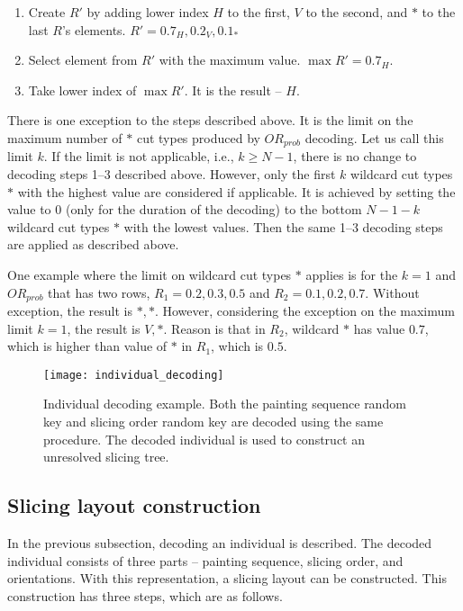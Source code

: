 \begin{enumerate}
    \item Create $R'$ by adding lower index $H$ to the first, $V$ to the second, and $*$ to the last $R$'s elements.
    $R' = 0.7_H, 0.2_V, 0.1_*$
    \item Select element from $R'$ with the maximum value. $\max R' = 0.7_H$.
    \item Take lower index of $\max R'$.
    It is the result – $H$.
\end{enumerate}

There is one exception to the steps described above.
It is the limit on the maximum number of $*$ cut types produced by $OR_{prob}$ decoding.
Let us call this limit $k$.
If the limit is not applicable, i.e., $k \geq N-1$, there is no change to decoding steps 1--3 described above.
However, only the first $k$ wildcard cut types $*$ with the highest value are considered if applicable.
It is achieved by setting the value to $0$ (only for the duration of the decoding) to the bottom $N-1-k$ wildcard cut types $*$ with the lowest values.
Then the same 1--3 decoding steps are applied as described above.

One example where the limit on wildcard cut types $*$ applies is for the $k=1$ and $OR_{prob}$ that has two rows, $R_1 = 0.2, 0.3, 0.5$ and $R_2 = 0.1, 0.2, 0.7$.
Without exception, the result is $*, *$.
However, considering the exception on the maximum limit $k=1$, the result is $V, *$.
Reason is that in $R_2$, wildcard $*$ has value $0.7$,
which is higher than value of $*$ in $R_1$, which is $0.5$.

\begin{figure}[h!]
    \texttt{[image: individual\_decoding]}
    \caption[Individual decoding example]{
        Individual decoding example. Both the painting sequence random key and slicing order random key
        are decoded using the same procedure.
        The decoded individual is used to construct an unresolved slicing tree. }
    \label{fig:individual-decoding}
\end{figure}


\subsection{Slicing layout construction}\label{subsec:slicing-tree-construction}
In the previous subsection, decoding an individual is described.
The decoded individual consists of three parts – painting sequence, slicing order, and orientations.
With this representation, a slicing layout can be constructed.
This construction has three steps, which are as follows.

